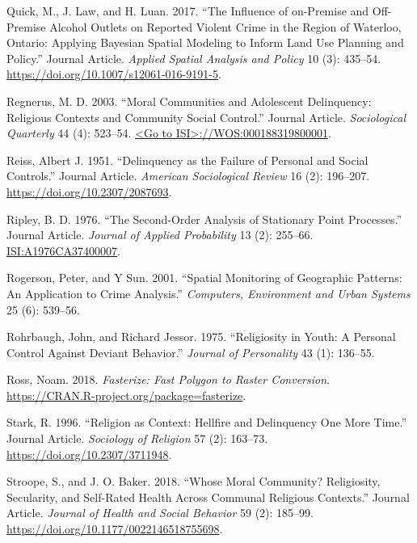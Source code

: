 \documentclass[smallextended]{svjour3}       %
\begin{document}
\leavevmode\hypertarget{ref-Quick2017influence}{}%
Quick, M., J. Law, and H. Luan. 2017. ``The Influence of on-Premise and
Off-Premise Alcohol Outlets on Reported Violent Crime in the Region of
Waterloo, Ontario: Applying Bayesian Spatial Modeling to Inform Land Use
Planning and Policy.'' Journal Article. \emph{Applied Spatial Analysis
and Policy} 10 (3): 435--54.
\url{https://doi.org/10.1007/s12061-016-9191-5}.

\leavevmode\hypertarget{ref-Regnerus2003moral}{}%
Regnerus, M. D. 2003. ``Moral Communities and Adolescent Delinquency:
Religious Contexts and Community Social Control.'' Journal Article.
\emph{Sociological Quarterly} 44 (4): 523--54.
\href{\%3CGo\%20to\%20ISI\%3E://WOS:000188319800001}{\textless{}Go to ISI\textgreater{}://WOS:000188319800001}.

\leavevmode\hypertarget{ref-Reiss1951delinquency}{}%
Reiss, Albert J. 1951. ``Delinquency as the Failure of Personal and
Social Controls.'' Journal Article. \emph{American Sociological Review}
16 (2): 196--207. \url{https://doi.org/10.2307/2087693}.

\leavevmode\hypertarget{ref-Ripley1976second}{}%
Ripley, B. D. 1976. ``The Second-Order Analysis of Stationary Point
Processes.'' Journal Article. \emph{Journal of Applied Probability} 13
(2): 255--66. \url{ISI:A1976CA37400007}.

\leavevmode\hypertarget{ref-Rogerson2001spatial}{}%
Rogerson, Peter, and Y Sun. 2001. ``Spatial Monitoring of Geographic
Patterns: An Application to Crime Analysis.'' \emph{Computers,
Environment and Urban Systems} 25 (6): 539--56.

\leavevmode\hypertarget{ref-Rohrbaugh1975religiosity}{}%
Rohrbaugh, John, and Richard Jessor. 1975. ``Religiosity in Youth: A
Personal Control Against Deviant Behavior.'' \emph{Journal of
Personality} 43 (1): 136--55.

\leavevmode\hypertarget{ref-Ross2018fasterize}{}%
Ross, Noam. 2018. \emph{Fasterize: Fast Polygon to Raster Conversion}.
\url{https://CRAN.R-project.org/package=fasterize}.

\leavevmode\hypertarget{ref-Stark1996religion}{}%
Stark, R. 1996. ``Religion as Context: Hellfire and Delinquency One More
Time.'' Journal Article. \emph{Sociology of Religion} 57 (2): 163--73.
\url{https://doi.org/10.2307/3711948}.

\leavevmode\hypertarget{ref-Stroope2018moral}{}%
Stroope, S., and J. O. Baker. 2018. ``Whose Moral Community?
Religiosity, Secularity, and Self-Rated Health Across Communal Religious
Contexts.'' Journal Article. \emph{Journal of Health and Social
Behavior} 59 (2): 185--99.
\url{https://doi.org/10.1177/0022146518755698}.
\end{document}

